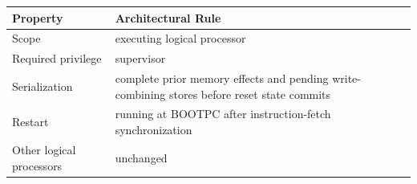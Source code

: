 \Needspace{1.25in}
\begingroup\footnotesize
\setlength{\aboverulesep}{0pt}
\setlength{\belowrulesep}{0pt}
\setlength{\extrarowheight}{1.2pt}
\begin{center}
\begin{tabularx}{\linewidth}{@{}>{\raggedright\arraybackslash}p{1.35in}>{\raggedright\arraybackslash}X@{}}
\toprule
\rowcolor{ManualHeaderFill}
\textbf{Property} & \textbf{Architectural Rule}\\
\midrule
Scope & executing logical processor\\
Required privilege & supervisor\\
Serialization & complete prior memory effects and pending write-combining stores before reset state commits\\
Restart & running at BOOTPC after instruction-fetch synchronization\\
Other logical processors & unchanged\\
\bottomrule
\end{tabularx}
\end{center}
\endgroup


